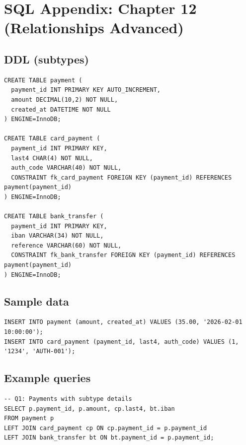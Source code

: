 \chapter{SQL Appendix: Chapter 12 (Relationships Advanced)}

\section{DDL (subtypes)}
\begin{verbatim}
CREATE TABLE payment (
  payment_id INT PRIMARY KEY AUTO_INCREMENT,
  amount DECIMAL(10,2) NOT NULL,
  created_at DATETIME NOT NULL
) ENGINE=InnoDB;

CREATE TABLE card_payment (
  payment_id INT PRIMARY KEY,
  last4 CHAR(4) NOT NULL,
  auth_code VARCHAR(40) NOT NULL,
  CONSTRAINT fk_card_payment FOREIGN KEY (payment_id) REFERENCES payment(payment_id)
) ENGINE=InnoDB;

CREATE TABLE bank_transfer (
  payment_id INT PRIMARY KEY,
  iban VARCHAR(34) NOT NULL,
  reference VARCHAR(60) NOT NULL,
  CONSTRAINT fk_bank_transfer FOREIGN KEY (payment_id) REFERENCES payment(payment_id)
) ENGINE=InnoDB;
\end{verbatim}

\section{Sample data}
\begin{verbatim}
INSERT INTO payment (amount, created_at) VALUES (35.00, '2026-02-01 10:00:00');
INSERT INTO card_payment (payment_id, last4, auth_code) VALUES (1, '1234', 'AUTH-001');
\end{verbatim}

\section{Example queries}
\begin{verbatim}
-- Q1: Payments with subtype details
SELECT p.payment_id, p.amount, cp.last4, bt.iban
FROM payment p
LEFT JOIN card_payment cp ON cp.payment_id = p.payment_id
LEFT JOIN bank_transfer bt ON bt.payment_id = p.payment_id;
\end{verbatim}
